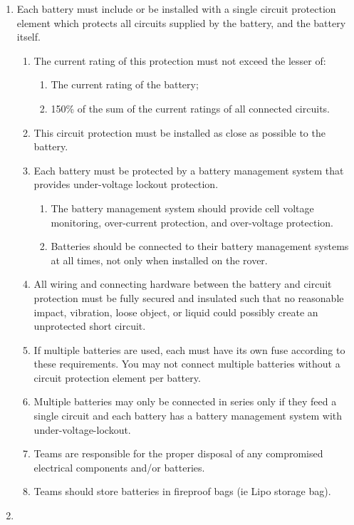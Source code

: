 \begin{enumerate}
        \item Each battery must include or be installed with a single circuit protection element which protects all circuits supplied by the battery, and the battery itself.
        \begin{enumerate}
            \item The current rating of this protection must not exceed the lesser of:
            \begin{enumerate}
                \item The current rating of the battery;
                \item 150\% of the sum of the current ratings of all connected circuits.
            \end{enumerate}
            \item This circuit protection must be installed as close as possible to the battery.
            \item Each battery must be protected by a battery management system that provides under-voltage lockout protection.
            \begin{enumerate}
                \item The battery management system should provide cell voltage monitoring, over-current protection, and over-voltage protection.
                \item Batteries should be connected to their battery management systems at all times, not only when installed on the rover.
            \end{enumerate}
            \item All wiring and connecting hardware between the battery and circuit protection must be fully secured and insulated such that no reasonable impact, vibration, loose object, or liquid could possibly create an unprotected short circuit.
            \item If multiple batteries are used, each must have its own fuse according to these requirements. You may not connect multiple batteries without a circuit protection element per battery.
            \item Multiple batteries may only be connected in series only if they feed a single circuit and each battery has a battery management system with under-voltage-lockout.
            \item Teams are responsible for the proper disposal of any compromised electrical components and/or batteries.
            \item Teams should store batteries in fireproof bags (ie Lipo storage bag).
        \end{enumerate}
        \item 
    \end{enumerate}




